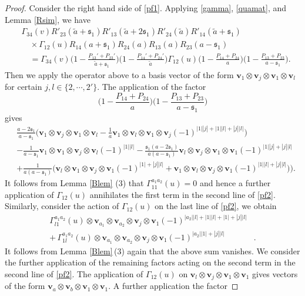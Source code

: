 \documentclass[11pt,reqno]{amsart}
\numberwithin{equation}{section}
\theoremstyle{definition}
\theoremstyle{remark}
\newcommand{\beq}{\begin{equation}}
\newcommand{\eeq}{\end{equation}}
\newcommand{\tl}{\tilde}
\newcommand{\ka}{{\mathfrak s}}
\begin{document}
\begin{proof}
Consider the right hand side of \eqref{pf1}. Applying \eqref{gamma}, \eqref{quamat}, and Lemma \ref{Rsim}, we have
\begin{align*}
&\Gamma_{34}(v)R'_{23}(\tl a+\ka_1)R'_{13}(\tl a+2\ka_1)R'_{24}(\tl a)R'_{14}(\tl a+\ka_1)\\
&\quad\times\Gamma_{12}(u) R_{14}(a+\ka_1)R_{24}(a)R_{13}(a)R_{23}(a-\ka_1)\\
&\quad =\Gamma_{34}(v)\Big(1-\frac{P_{13}'+P_{23}'}{\tl a+\ka_1}\Big)\Big(1-\frac{P_{14}'+P_{24}'}{\tl a}\Big)\Gamma_{12}(u)\Big(1-\frac{P_{14}+P_{24}}{a}\Big)\Big(1-\frac{P_{13}+P_{23}}{a-\ka_1}\Big).
\end{align*}
Then we apply the operator above to a basis vector of the form $\mathbf v_1\otimes \mathbf v_j\otimes \mathbf v_1\otimes \mathbf v_l$ for certain $j,l\in\{2,\cdots,2'\}$. The application of the factor
\[
\Big(1-\frac{P_{14}+P_{24}}{a}\Big)\Big(1-\frac{P_{13}+P_{23}}{a-\ka_1}\Big)
\]
gives
\beq\label{pf2}
\begin{split}
&\frac{a-2\ka_1}{a-\ka_1}\Big(\mathbf v_1\otimes \mathbf v_j\otimes \mathbf v_1\otimes \mathbf v_l  -\frac{1}{a}\mathbf v_1\otimes \mathbf v_l\otimes \mathbf v_1\otimes \mathbf v_j(-1)^{|1||j|+|1||l|+|j||l|}\Big)\\
&- \frac{1}{a-\ka_1}\mathbf v_{1}\otimes \mathbf v_1\otimes \mathbf v_j\otimes \mathbf v_l(-1)^{|1||l|}-\frac{\ka_1(a-2\ka_1)}{a(a-\ka_1)}\mathbf v_l\otimes \mathbf v_j\otimes \mathbf v_1\otimes \mathbf v_1(-1)^{|1||j|+|j||l|} \\
&+ \frac{1}{a(a-\ka_1)}\Big(\mathbf v_l\otimes \mathbf v_1\otimes \mathbf v_j\otimes \mathbf v_1(-1)^{|1|+|j||l|}+\mathbf v_1\otimes \mathbf v_l\otimes \mathbf v_j\otimes \mathbf v_1(-1)^{|1||l|+|j||l|})\Big).
\end{split}
\eeq
It follows from Lemma \ref{Blem} (3) that $\Gamma_{11}^{a_1a_2}(u)=0$ and hence a further application of $\Gamma_{12}(u)$ annihilates the first term in the second line of \eqref{pf2}. Similarly, consider the action of $\Gamma_{12}(u)$ on the last line of \eqref{pf2}, we obtain
\begin{align*}
\Gamma_{l1}^{a_1a_2}(u)\otimes \mathbf v_{a_1}\otimes \mathbf v_{a_2}\otimes \mathbf v_j\otimes \mathbf v_1(-1)^{|a_2||l|+|1||l|+|1|+|j||l|}&\\
+\,\Gamma_{1l}^{a_1a_2}(u)\otimes \mathbf v_{a_1}\otimes \mathbf v_{a_2}\otimes \mathbf v_j\otimes \mathbf v_1(-1)^{|a_2||1|+|j||l|}&.
\end{align*}
It follows from Lemma \ref{Blem}\,(3) again that the above sum vanishes. We consider the further application of the remaining factors acting on the second term in the second line of \eqref{pf2}. The application of $\Gamma_{12}(u)$ on $\mathbf v_l\otimes \mathbf v_j\otimes \mathbf v_1\otimes \mathbf v_1$ gives vectors of the form $\mathbf v_a\otimes \mathbf v_b\otimes \mathbf v_1\otimes \mathbf v_1$. A further application the factor

\end{proof}
\end{document}
